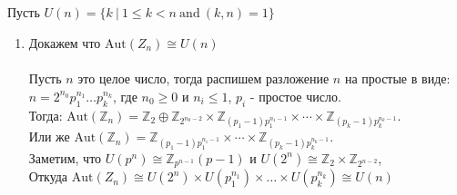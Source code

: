 		\subsection{}
			
			
		
		\subsection{}
		Пусть $U(n) = \{ k\ |\ 1 \leqslant k < n\ \text{and}\ (k,n) = 1 \}$ 
		\begin{enumerate}
			\item Докажем что $\text{Aut}(Z_n) \cong U(n)$\\
			\\
			Пусть $n$ это целое число, тогда распишем разложение $n$ на простые в виде: $n = 2^{n_0} p_1^{n_1} \ldots p_k^{n_k}$, где $n_0 \geqslant 0$ и $n_i \leqslant 1$, $p_i$ - простое число.\\
			Тогда: $\text{Aut}(\mathbb{Z}_{n})=\mathbb{Z}_{2} \oplus \mathbb{Z}_{2^{n_{0}-2}} \times \mathbb{Z}_{(p_{1}-1) p_{1}^{n_{1}-1}} \times \cdots \times \mathbb{Z}_{(p_{k}-1) p_{k}^{n_{k}-1}}$. \\
			Или же $\text{Aut}(\mathbb{Z}_{n})=\mathbb{Z}_{(p_{1}-1) p_{1}^{n_{1}-1}} \times \cdots \times \mathbb{Z}_{(p_{k}-1) p_{k}^{n_{k}-1}}$. \\
			Заметим, что $U(p^{n}) \cong \mathbb{Z}_{p^{n-1}}(p-1)$ и $U(2^{n}) \cong \mathbb{Z}_{2} \times \mathbb{Z}_{2^{n-2}}$,\\ Откуда $\text{Aut}(Z_n) \cong U(2^{n}) \times U(p_1^{n_1}) \times \ldots \times U(p_k^{n_k}) \cong U(n)$
			

\end{enumerate}

